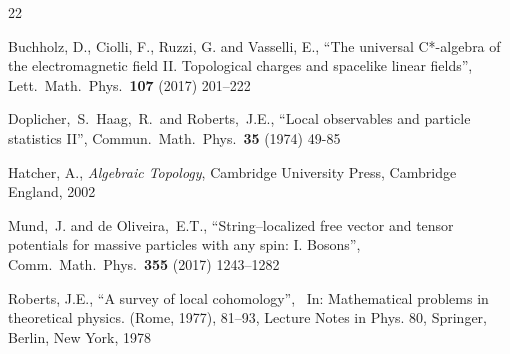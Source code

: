 \documentclass[11pt]{article}
\numberwithin{equation}{section}
\begin{document}
\begin{thebibliography}{22}
{ Buchholz, D., Ciolli, F., Ruzzi, G. and Vasselli, E., 
``The universal C*-algebra of the electromagnetic field II.
Topological charges and spacelike linear fields'',
Lett.\ Math.\ Phys.\ {\bf 107} (2017) 201--222 \ 



 Doplicher,~S.\ Haag,~R.\ and Roberts,~J.E., 
``Local observables and particle statistics II'',
Commun.\ Math.\ Phys.\ {\bf 35} (1974) 49-85 





 Hatcher, A.,  
{\it Algebraic Topology}, 
Cambridge University Press, Cambridge England, 2002 

 Mund,~J. and de Oliveira,~E.T., 
``String–localized free vector and tensor potentials for
massive particles with any spin: I. Bosons'', 
Comm.\ Math.\ Phys.\ {\bf 355} (2017) 1243–1282 



 Roberts, J.E., 
``A survey of local cohomology'', \ 
In: Mathematical problems in theoretical physics. (Rome, 1977), 81--93, 
Lecture Notes in Phys. 80, Springer, Berlin, New York, 1978

}
\end{thebibliography}
\end{document}
